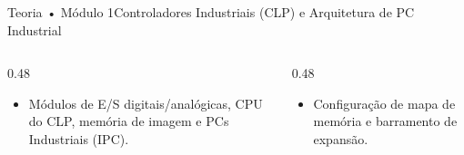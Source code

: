 \begin{senaiframe}{Teoria • Módulo 1}{Controladores Industriais (CLP) e Arquitetura de PC Industrial}
  \begin{columns}[t]
    \begin{column}{0.48\textwidth}
      \begin{tcolorbox}[senaibluecard, title={Fundamentos Teóricos}]
        \begin{itemize}
          \item Módulos de E/S digitais/analógicas, CPU do CLP, memória de imagem e PCs Industriais (IPC).
        \end{itemize}
      \end{tcolorbox}
    \end{column}
    \begin{column}{0.48\textwidth}
      \begin{tcolorbox}[senaigreencard, title={Prática \& Laboratório}]
        \begin{itemize}
          \item Configuração de mapa de memória e barramento de expansão.
        \end{itemize}
      \end{tcolorbox}
    \end{column}
  \end{columns}
\end{senaiframe}
